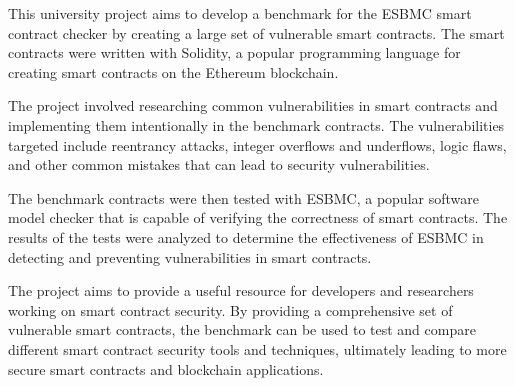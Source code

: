 \abstracttitle
%
{\singlespacing
This university project aims to develop a benchmark for the ESBMC smart contract checker by creating a large set of vulnerable smart contracts. The smart contracts were written with Solidity, a popular programming language for creating smart contracts on the Ethereum blockchain.

The project involved researching common vulnerabilities in smart contracts and implementing them intentionally in the benchmark contracts. The vulnerabilities targeted include reentrancy attacks, integer overflows and underflows, logic flaws, and other common mistakes that can lead to security vulnerabilities.

The benchmark contracts were then tested with ESBMC, a popular software model checker that is capable of verifying the correctness of smart contracts. The results of the tests were analyzed to determine the effectiveness of ESBMC in detecting and preventing vulnerabilities in smart contracts.

The project aims to provide a useful resource for developers and researchers working on smart contract security. By providing a comprehensive set of vulnerable smart contracts, the benchmark can be used to test and compare different smart contract security tools and techniques, ultimately leading to more secure smart contracts and blockchain applications.
}

